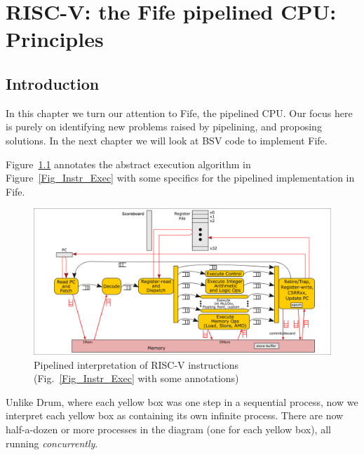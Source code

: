 

\chapter{RISC-V: the Fife pipelined CPU: Principles}


\setcounter{page}{1}
\renewcommand{\thepage}{\arabic{chapter}-\arabic{page}}

\label{ch_Fife_Pending}


\section{Introduction}

In this chapter we turn our attention to Fife, the pipelined CPU.  Our
focus here is purely on identifying new problems raised by pipelining,
and proposing solutions.  In the next chapter we will look at BSV code
to implement Fife.

Figure~\ref{Fig_Instr_Exec_w_FIFOs} annotates the abstract execution
algorithm in Figure~\ref{Fig_Instr_Exec} with some specifics for the
pipelined implementation in Fife.
\begin{figure}[htbp]
  \centerline{\includegraphics[width=6in,angle=0]{Figures/Fig_Instr_Exec_w_FIFOs}}
  \caption{\label{Fig_Instr_Exec_w_FIFOs}Pipelined interpretation of RISC-V instructions (Fig.~\ref{Fig_Instr_Exec} with some annotations)}
\end{figure}
Unlike Drum, where each yellow box was one step in a sequential
process, now we interpret each yellow box as containing its own
infinite process.  There are now half-a-dozen or more processes in the
diagram (one for each yellow box), all running \emph{concurrently}.

